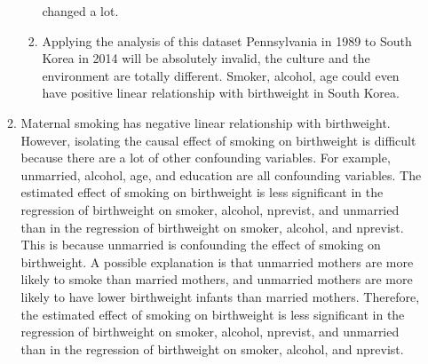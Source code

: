 \documentclass{uofa-eng-assignment}
\begin{document}
\begin{enumerate}
\begin{enumerate}
\begin{enumerate}
                            changed a lot.
                      \item Applying the analysis of this dataset Pennsylvania in 1989 to South Korea in
                            2014 will be absolutely invalid, the culture and the environment are totally
                            different. Smoker, alcohol, age could even have positive linear relationship
                            with birthweight in South Korea.
                  \end{enumerate}
            \item Maternal smoking has negative linear relationship with birthweight. However,
                  isolating the causal effect of smoking on birthweight is difficult because
                  there are a lot of other confounding variables. For example, unmarried,
                  alcohol, age, and education are all confounding variables. The estimated effect
                  of smoking on birthweight is less significant in the regression of birthweight
                  on smoker, alcohol, nprevist, and unmarried than in the regression of
                  birthweight on smoker, alcohol, and nprevist. This is because unmarried is
                  confounding the effect of smoking on birthweight. A possible explanation is
                  that unmarried mothers are more likely to smoke than married mothers, and
                  unmarried mothers are more likely to have lower birthweight infants than
                  married mothers. Therefore, the estimated effect of smoking on birthweight is
                  less significant in the regression of birthweight on smoker, alcohol, nprevist,
                  and unmarried than in the regression of birthweight on smoker, alcohol, and
                  nprevist.
        \end{enumerate}
\end{enumerate}
\end{document}
